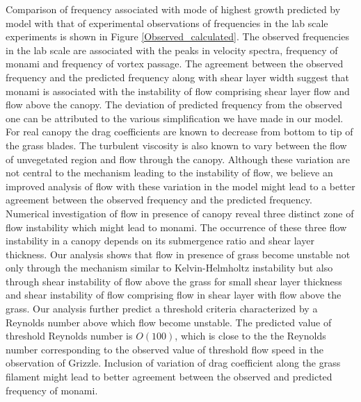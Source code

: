 \documentclass[aps,prl,twocolumn,showpacs,superscriptaddress,groupedaddress,10pt]{revtex4-1}  %
\begin{document}
\newline
Comparison of frequency associated with mode of highest growth predicted by model with that of experimental observations of frequencies in the lab scale experiments is shown in
Figure \ref{Observed_calculated}.
The observed frequencies in the lab scale are associated with the peaks in velocity spectra, frequency of monami and frequency of vortex passage. The agreement between the observed
frequency and the predicted frequency along with shear layer width suggest that monami is associated with the instability of flow comprising shear layer flow and flow above the canopy.
The deviation of predicted frequency from the observed one can be attributed to the various simplification we have made in our model. For real canopy the drag coefficients are known to
decrease from bottom to tip of the grass blades. The turbulent viscosity is also known to vary between the flow of unvegetated region and flow through the canopy. Although these variation
are not central to the mechanism leading to the instability of flow, we believe an improved analysis of flow with these variation in the model might lead to a better agreement between the
observed frequency and the predicted frequency.   
\newline
Numerical investigation of flow in presence of canopy reveal three distinct zone of flow instability which might lead to monami. The occurrence of these three flow instability in a canopy
depends on its submergence ratio and shear layer thickness. Our analysis shows that flow in presence of grass become unstable not only through the mechanism similar to Kelvin-Helmholtz
instability but also through shear instability of flow above the grass for small shear layer thickness and shear instability of flow comprising flow in shear layer with flow above the grass.
Our analysis further predict a threshold criteria characterized by a Reynolds number above which flow become unstable. The predicted value of threshold Reynolds number is $O(100)$, which is 
close to the the Reynolds number corresponding to the observed value of threshold flow speed in the observation of Grizzle. Inclusion of variation of drag coefficient along the grass filament
might lead to better agreement between the observed and predicted frequency of monami. 
{}

\end{document}
